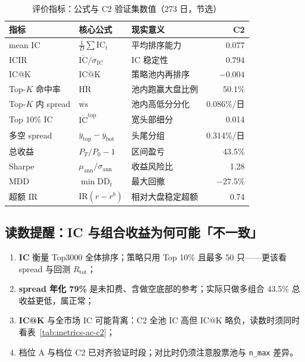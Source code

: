 \documentclass[UTF8,a4paper,12pt]{ctexart}
\begin{document}
\begin{table}[H]
\centering
\caption{评价指标：公式与 C2 验证集数值（273 日，节选）}
\label{tab:metric-def}
\small
\begin{tabular}{llp{3.5cm}r}
\toprule
\textbf{指标} & \textbf{核心公式} & \textbf{现实意义} & \textbf{C2} \\
\midrule
mean IC & $\frac{1}{D}\sum \mathrm{IC}_t$ & 平均排序能力 & 0.077 \\
ICIR & $\overline{\mathrm{IC}}/\sigma_{\mathrm{IC}}$ & IC 稳定性 & 0.794 \\
IC@K & $\overline{\mathrm{IC@K}}$ & 策略池内再排序 & $-0.004$ \\
Top-$K$ 命中率 & $\overline{\mathrm{HR}}$ & 池内跑赢大盘比例 & 50.1\% \\
Top-$K$ 内 spread & $\overline{\mathrm{ws}}$ & 池内高低分分化 & 0.086\%/日 \\
Top 10\% IC & $\overline{\mathrm{IC}}^{\mathrm{top}}$ & 宽头部细分 & 0.014 \\
多空 spread & $\overline{y}_{\mathrm{top}}-\overline{y}_{\mathrm{bot}}$ & 头尾分组 & 0.314\%/日 \\
总收益 & $P_T/P_0-1$ & 区间盈亏 & 43.5\% \\
Sharpe & $\mu_{\mathrm{ann}}/\sigma_{\mathrm{ann}}$ & 收益风险比 & 1.28 \\
MDD & $\min \mathrm{DD}_t$ & 最大回撤 & $-27.5\%$ \\
超额 IR & $\mathrm{IR}(r-r^b)$ & 相对大盘稳定超额 & 0.74 \\
\bottomrule
\end{tabular}
\end{table}

\subsection{读数提醒：IC 与组合收益为何可能「不一致」}

\begin{enumerate}[leftmargin=2em]
  \item \textbf{IC} 衡量 Top3000 全体排序；策略只用 Top 10\% 且最多 50 只——更该看 spread 与回测 $R_{\mathrm{tot}}$；
  \item \textbf{spread 年化 79\%} 是未扣费、含做空底部的参考；实际只做多组合 43.5\% 总收益更低，属正常；
  \item \textbf{IC@K} 与全市场 IC 可能背离：C2 全池 IC 高但 IC@K 略负，读数时须同时看表~\ref{tab:metrics-ac-c2}；
  \item 档位 A 与档位 C2 已对齐验证时段；对比时仍须注意股票池与 \texttt{n\_max} 差异。
\end{enumerate}
\end{document}
